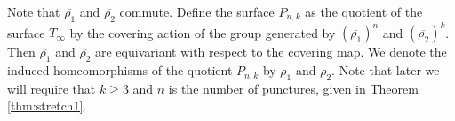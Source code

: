 Note that $\overline{\rho_1}$ and $\overline{\rho_2}$ commute. Define the surface $P_{n,k}$ as the quotient of the surface $T_\infty$ by the
covering action of the group generated by $(\overline{\rho_1})^n$ and $(\overline{\rho_2})^k$. Then
$\overline{\rho_1}$ and $\overline{\rho_2}$ are equivariant with respect to the covering map.  We denote the induced homeomorphisms of the quotient $P_{n,k}$ by $\rho_1$
and $\rho_2$.  Note that later we will require that $k\geq 3$ and $n$ is the number of punctures, given in Theorem \ref{thm:stretch1}.


